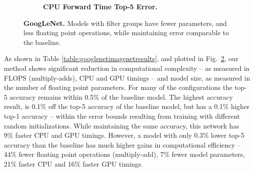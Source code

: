 \documentclass[thesis]{subfiles}
\begin{document}
\begin{figure}[tbp]
\begin{subfigure}[b]{\columnwidth}
		\centering
		\caption{\textbf{CPU Forward Time \vs Top-5 Error.}}
		\label{fig:googlenet50cpuforward}
	\end{subfigure}
	
	\caption{\textbf{GoogLeNet.} Models with filter groups have fewer parameters, and less floating point operations, while maintaining error comparable to the baseline.}
	\label{fig:googlenet50plots}
\end{figure}
	
	As shown in Table \ref{table:googlenetimagenetresults}, and plotted in Fig.~\ref{fig:googlenet50plots}, our method shows significant reduction in computational complexity -- as measured in FLOPS (multiply-adds), CPU and GPU timings -- and model size, as measured in the number of floating point parameters. For many of the configurations the top-5 accuracy remains within 0.5\% of the baseline model. 
	The highest accuracy result, is 0.1\% off the top-5 accuracy of the baseline model, but has a 0.1\% higher top-1 accuracy -- within the error bounds resulting from training with different random initializations. While maintaining the same accuracy, this network has 9\% faster CPU and GPU timings. However, a model with only 0.3\% lower top-5 accuracy than the baseline has much higher gains in computational efficiency -- 44\% fewer floating point operations (multiply-add), 7\% fewer model parameters, 21\% faster CPU and 16\% faster GPU timings.
	
\end{document}
